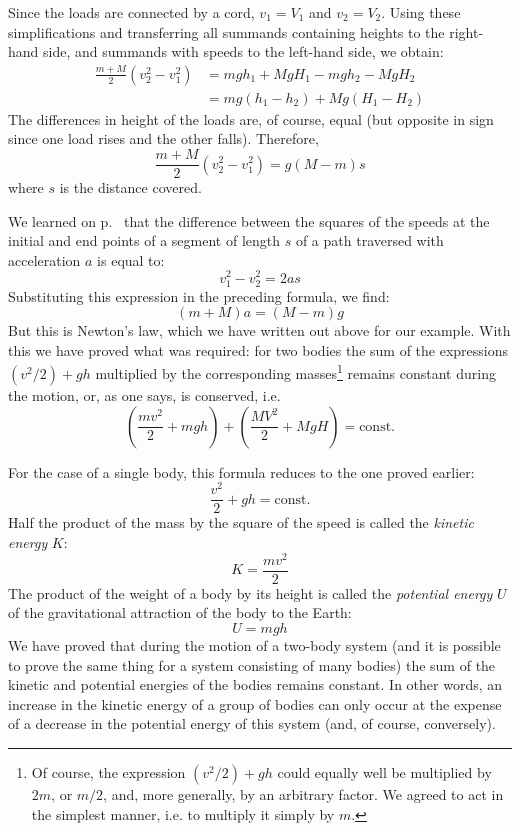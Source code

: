 Since the loads are connected by a cord, $v_{1} = V_{1}$ and
$v_{2} = V_{2}$. Using these simplifications and transferring
all summands containing heights to the right-hand side,
and summands with speeds to the left-hand side, we
obtain:
\begin{align*}%
\frac{m+M}{2} (v_{2}^{2}-v_{1}^{2}) & = mgh_{1}+MgH_{1}-mgh_{2}-MgH_{2}\\
& = mg(h_{1}-h_{2}) + Mg(H_{1}-H_{2})
\end{align*}
The differences in height of the loads are, of course,
equal (but opposite in sign since one load rises and the other falls). Therefore,
\begin{equation*}%
\frac{m+M}{2} (v_{2}^{2}-v_{1}^{2}) = g(M - m)s
\end{equation*}
where $s$ is the distance covered.

We learned on p.~\pageref{dist-time-acc} that the difference between the squares of the speeds at the initial and end points of a
segment of length $s$ of a path traversed with acceleration $a$ is equal to:
\begin{equation*}%
v_{1}^{2}-v_{2}^{2} = 2as
\end{equation*}
Substituting this expression in the preceding formula, we find:
\begin{equation*}%
(m + M) a = (M - m) g
\end{equation*}
But this is Newton's law, which we have written out
above for our example. With this we have proved what
was required: for two bodies the sum of the expressions
$(v^{2} /2) +gh$ multiplied by the corresponding masses\footnote{Of course, the expression $(v^{2} / 2) +gh$ could equally well be multiplied by $2m$, or $m/2$, and, more generally, by an arbitrary factor. We agreed to act in the simplest manner, i.e. to multiply it simply by $m$.} remains constant during the motion, or, as one says, is conserved, i.e.
\begin{equation*}%
\left(\frac{mv^{2}}{2} + mgh\right) + \left(\frac{MV^{2}}{2} + MgH\right) = \textrm{const.}
\end{equation*}

For the case of a single body, this formula reduces to
the one proved earlier:
\begin{equation*}%
\frac{v^{2}}{2} + gh = \textrm{const.}
\end{equation*}
Half the product of the mass by the square of the speed
is called the \emph{kinetic energy} $K$:
\begin{equation*}%
K = \frac{mv^{2}}{2}
\end{equation*}
The product of the weight of a body by its height is
called the \emph{potential energy} $U$ of the gravitational attraction of the body to the Earth:
\begin{equation*}%
U = mgh
\end{equation*}
We have proved that during the motion of a two-body
system (and it is possible to prove the same thing for a
system consisting of many bodies) the sum of the kinetic
and potential energies of the bodies remains constant.
In other words, an increase in the kinetic energy of a
group of bodies can only occur at the expense of a decrease
in the potential energy of this system (and, of course,
conversely).

